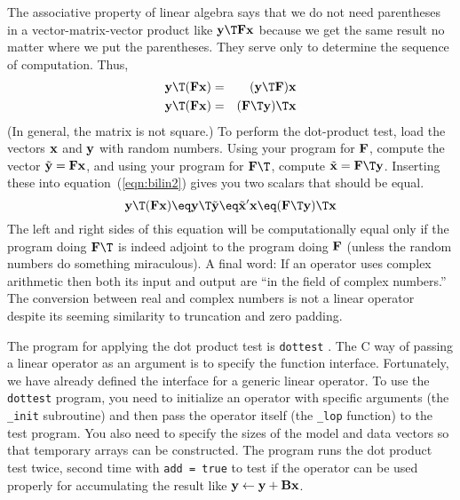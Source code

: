 \par
The associative property of linear algebra says that
we do not need parentheses in a vector-matrix-vector product
like $\bold y\T \bold F \bold x $ because we get the same
result no matter where we put the parentheses.
They serve only to determine the
sequence of computation.
Thus,
\begin{eqnarray}
\bold y\T ( \bold F \bold x ) &=& ( \bold y\T \bold F )  \bold x   \\
\bold y\T ( \bold F \bold x ) &=& ( \bold F\T \bold y )\T \bold x 
\label{eqn:bilin2}
\end{eqnarray}
(In general, the matrix is not square.)
To perform the dot-product test,
load the vectors $\bold x$ and $\bold y$ with random numbers.
Using your program for $\bold F$,
compute the vector $\tilde{\bold{y}} = \bold{F}\bold{x}$,
and using your program for $\bold{F}\T$,
compute $\tilde{\bold{x}} = \bold{F}\T\bold{y}$.
Inserting these into equation~(\ref{eqn:bilin2})
gives you two scalars that should be equal.
\begin{equation}
\bold{y}\T ( \bold F \bold x ) \eq
\bold y\T \tilde{\bold y} \eq \tilde{\bold x} ' \bold x
\eq ( \bold F\T \bold y )\T \bold x
\label{eqn:bilin}
\end{equation}
The left and right sides of this equation will be computationally equal
only if the program doing $\bold F\T$ is indeed adjoint
to the program doing $\bold F$
(unless the random numbers do something miraculous).
A final word: If an operator uses complex arithmetic
then both its input and output are ``in the field of complex numbers.''
The conversion between real and complex numbers is not a linear operator
despite its seeming similarity to truncation and zero padding.

\par
The program for applying the dot product test is \texttt{dottest}
. 
The C way of passing a linear operator
as an argument is to specify the function interface. Fortunately, we
have already defined the interface for a generic linear operator. To
use the \texttt{dottest} program, you need to initialize an operator
with specific arguments (the \texttt{\_init} subroutine) and then pass
the operator itself (the \texttt{\_lop} function) to the test program.
You also need to specify the sizes of the model and data vectors so
that temporary arrays can be constructed. The program runs the dot
product test twice, second time with \texttt{add = true} to test if
the operator can be used properly for accumulating the result like
$\bold y \leftarrow \bold y+\bold B\bold x$.

